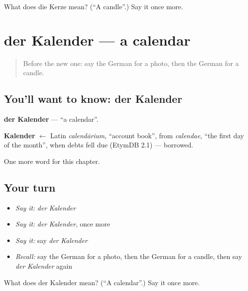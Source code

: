 \begin{tcolorbox}[breakable,colback=teal!4,colframe=teal!35!black,title={Before you move on}]
What does die Kerze mean? (\textquotedblleft{}A candle\textquotedblright{}.) Say it once more.
\end{tcolorbox}
\section[der Kalender]{der Kalender — a calendar}

\label{lesson:GE-C118-kalender}



\begin{quote}
Before the new one: say the German for a photo, then the German for a candle.
\end{quote}

\subsection*{You'll want to know: der Kalender}
\textbf{der Kalender} — \textquotedblleft{}a calendar\textquotedblright{}.

\begin{cousinweb}
\textbf{Kalender} $\leftarrow$ Latin \emph{calendārium}, \textquotedblleft{}account book\textquotedblright{}, from \emph{calendae}, \textquotedblleft{}the first day of the month\textquotedblright{}, when debts fell due (EtymDB 2.1) — borrowed.
\end{cousinweb}

\begin{grammarlens}[title={What you've built}]
One more word for this chapter.
\end{grammarlens}

\subsection*{Your turn}
\begin{itemize}
\raggedright
  \item \emph{Say it:} \emph{der Kalender}
  \item \emph{Say it:} \emph{der Kalender}, once more
  \item \emph{Say it:} say \emph{der Kalender}
  \item \emph{Recall:} say the German for a photo, then the German for a candle, then say \emph{der Kalender} again
\end{itemize}

\begin{tcolorbox}[breakable,colback=teal!4,colframe=teal!35!black,title={Before you move on}]
What does der Kalender mean? (\textquotedblleft{}A calendar\textquotedblright{}.) Say it once more.
\end{tcolorbox}
